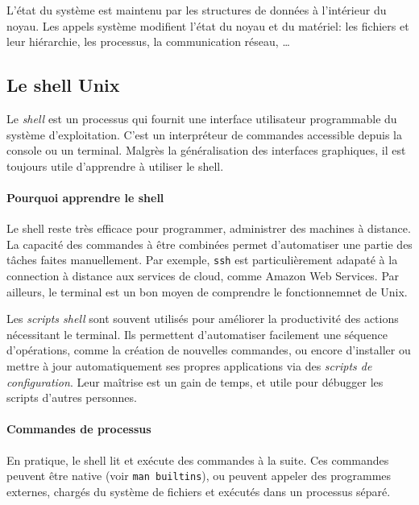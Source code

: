\documentclass[french, toc]{../cs-classes/cs-classes}
\begin{document}
L'état du système est maintenu par les structures de données à l'intérieur du noyau. Les appels système modifient l'état du noyau et du matériel: les fichiers et leur hiérarchie, les processus, la communication réseau, \dots

\subsection{Le shell Unix}
Le \emph{shell} est un processus qui fournit une interface utilisateur programmable du système d'exploitation. C'est un interpréteur de commandes accessible depuis la console ou un terminal. Malgrès la généralisation des interfaces graphiques, il est toujours utile d'apprendre à utiliser le shell. 

\paragraph*{Pourquoi apprendre le shell} Le shell reste très efficace pour programmer, administrer des machines à distance. La capacité des commandes à être combinées permet d'automatiser une partie des tâches faites manuellement. Par exemple, \texttt{ssh} est particulièrement adapaté à la connection à distance aux services de cloud, comme Amazon Web Services. Par ailleurs, le terminal est un bon moyen de comprendre le fonctionnemnet de Unix.

Les \emph{scripts shell} sont souvent utilisés pour améliorer la productivité des actions nécessitant le terminal. Ils permettent d'automatiser facilement une séquence d'opérations, comme la création de nouvelles commandes, ou encore d'installer ou mettre à jour automatiquement ses propres applications via des \emph{scripts de configuration}. Leur maîtrise est un gain de temps, et utile pour débugger les scripts d'autres personnes.

\paragraph*{Commandes de processus} En pratique, le shell lit et exécute des commandes à la suite. Ces commandes peuvent être native (voir \texttt{man builtins}), ou peuvent appeler des programmes externes, chargés du système de fichiers et exécutés dans un processus séparé. 
\end{document}
